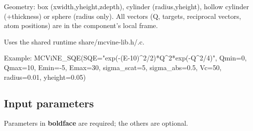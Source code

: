 Geometry: box (xwidth,yheight,zdepth), cylinder (radius,yheight), hollow cylinder (+thickness) or sphere (radius only). All vectors (Q, targets, reciprocal vectors, atom positions) are in the component's local frame.

Uses the shared runtime share/mcvine-lib.h/.c.

Example: MCViNE\_SQE(SQE="exp(-(E-10)\textasciicircum{}2/2)*Q\textasciicircum{}2*exp(-Q\textasciicircum{}2/4)", Qmin=0, Qmax=10, Emin=-5, Emax=30, sigma\_scat=5, sigma\_abs=0.5, Vc=50, radius=0.01, yheight=0.05)

\subsection*{Input parameters}
Parameters in \textbf{boldface} are required; the others are optional.

